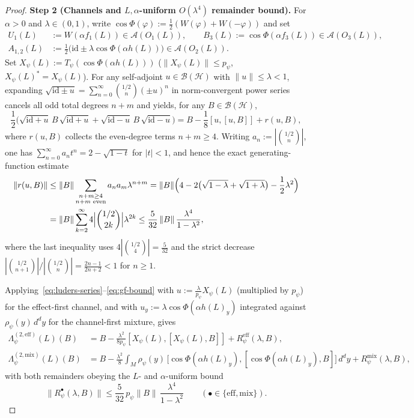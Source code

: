 \documentclass[11pt,a4paper]{article}
\theoremstyle{definition}
\theoremstyle{remark}
\newcommand{\HH}{\mathcal{H}}
\newcommand{\BB}{\mathcal{B}}
\newcommand{\Ac}{\mathcal{A}}
\newcommand{\id}{\mathrm{id}}
\newcommand{\norm}[1]{\|#1\|}
\begin{document}
\begin{proof}
\medskip\noindent\textbf{Step 2 (Channels and $L,\alpha$-uniform $O(\lambda^4)$ remainder bound).}
For $\alpha > 0$ and $\lambda\in (0,1)$, write $\cos\Phi(\varphi) := \frac{1}{2}(W(\varphi)+W(-\varphi))$ and set
\begin{align*}
U_1(L) &:= W(\alpha f_1(L))\in\Ac(O_1(L)), \qquad
B_3(L) := \cos\Phi(\alpha f_3(L))\in\Ac(O_3(L)), \\
A_{1,2}(L) &:= \frac{1}{2}\bigl(\id \pm \lambda\cos\Phi(\alpha h(L))\bigr)\in\Ac(O_2(L)).
\end{align*}
Set $X_\psi(L) := T_\psi(\cos\Phi(\alpha h(L)))$ ($\norm{X_\psi(L)}\le p_\psi$, $X_\psi(L)^* = X_\psi(L)$). For any self-adjoint $u\in\BB(\HH)$ with $\norm{u}\le\lambda < 1$, expanding $\sqrt{\id \pm u} = \sum_{n=0}^\infty \binom{1/2}{n}(\pm u)^n$ in norm-convergent power series cancels all odd total degrees $n+m$ and yields, for any $B\in\BB(\HH)$,
\begin{equation}\label{eq:luders-series}
\frac{1}{2}\bigl(\sqrt{\id+u}\,B\,\sqrt{\id+u} + \sqrt{\id-u}\,B\,\sqrt{\id-u}\bigr)
= B - \frac{1}{8}[u,[u,B]] + r(u,B),
\end{equation}
where $r(u,B)$ collects the even-degree terms $n+m\ge 4$. Writing $a_n := |\binom{1/2}{n}|$, one has $\sum_{n=0}^\infty a_n t^n = 2 - \sqrt{1-t}$ for $|t|<1$, and hence the exact generating-function estimate
\begin{align}
\norm{r(u,B)}
&\le \norm{B}\sum_{\substack{n+m\ge 4\\ n+m\text{ even}}} a_n a_m \lambda^{n+m}
= \norm{B}\Bigl(4 - 2\bigl(\sqrt{1-\lambda}+\sqrt{1+\lambda}\bigr) - \frac{1}{2}\lambda^2\Bigr) \nonumber\\
&= \norm{B}\sum_{k=2}^\infty 4\Bigl|\binom{1/2}{2k}\Bigr|\lambda^{2k}
\le \frac{5}{32}\,\norm{B}\,\frac{\lambda^4}{1-\lambda^2}, \label{eq:gf-bound}
\end{align}
where the last inequality uses $4|\binom{1/2}{4}| = \frac{5}{32}$ and the strict decrease $|\binom{1/2}{n+1}|/|\binom{1/2}{n}| = \frac{2n-1}{2n+2} < 1$ for $n\ge 1$.

Applying~\eqref{eq:luders-series}--\eqref{eq:gf-bound} with $u := \frac{\lambda}{p_\psi}X_\psi(L)$ (multiplied by $p_\psi$) for the effect-first channel, and with $u_y := \lambda\cos\Phi(\alpha h(L)_y)$ integrated against $\rho_\psi(y)\,d^dy$ for the channel-first mixture, gives
\begin{align}
\Lambda_\psi^{(2,\mathrm{eff})}(L)(B) &= B - \frac{\lambda^2}{8p_\psi}[X_\psi(L),[X_\psi(L),B]] + R_\psi^{\mathrm{eff}}(\lambda, B), \label{eq:exp-eff}\\
\Lambda_\psi^{(2,\mathrm{mix})}(L)(B) &= B - \frac{\lambda^2}{8}\int_M \rho_\psi(y)\,\bigl[\cos\Phi(\alpha h(L)_y), [\cos\Phi(\alpha h(L)_y), B]\bigr]\,d^dy + R_\psi^{\mathrm{mix}}(\lambda, B), \label{eq:exp-mix}
\end{align}
with both remainders obeying the $L$- and $\alpha$-uniform bound
\begin{equation}\label{eq:rem-uniform}
\norm{R_\psi^{\bullet}(\lambda, B)} \le \frac{5}{32}\,p_\psi\norm{B}\,\frac{\lambda^4}{1-\lambda^2} \qquad (\bullet\in\{\mathrm{eff},\mathrm{mix}\}).
\end{equation}


\end{proof}
\end{document}
